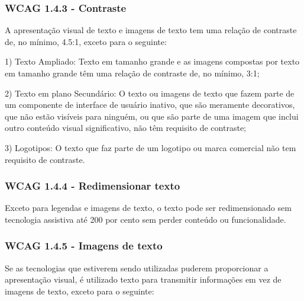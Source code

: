 \documentclass[a4paper]{article}
\begin{document}
\begin{titlepage}
\subsubsection{WCAG 1.4.3 - Contraste}

A apresentação visual de texto e imagens de texto tem uma relação de contraste de, no mínimo, 4.5:1, exceto para o seguinte:\\

\hspace{.1\textwidth} %
\begin{minipage}{.85\textwidth}
	1) Texto Ampliado: Texto em tamanho grande e as imagens compostas por texto em tamanho grande têm uma relação de contraste de, no mínimo, 3:1;\\
\end{minipage}

\hspace{.1\textwidth} %
\begin{minipage}{.85\textwidth}
	2) Texto em plano Secundário: O texto ou imagens de texto que fazem parte de um componente de interface de usuário inativo, que são meramente decorativos, que não estão visíveis para ninguém, ou que são parte de uma imagem que inclui outro conteúdo visual significativo, não têm requisito de contraste;\\
\end{minipage}

\hspace{.1\textwidth} %
\begin{minipage}{.85\textwidth}
	3) Logotipos: O texto que faz parte de um logotipo ou marca comercial não tem requisito de contraste.\\
\end{minipage}

\subsubsection{WCAG 1.4.4 - Redimensionar texto}

Exceto para legendas e imagens de texto, o texto pode ser redimensionado sem tecnologia assistiva até 200 por cento sem perder conteúdo ou funcionalidade.

\subsubsection{WCAG 1.4.5 - Imagens de texto}

Se as tecnologias que estiverem sendo utilizadas puderem proporcionar a apresentação visual, é utilizado texto para transmitir informações em vez de imagens de texto, exceto para o seguinte:\\


\end{titlepage}
\end{document}
